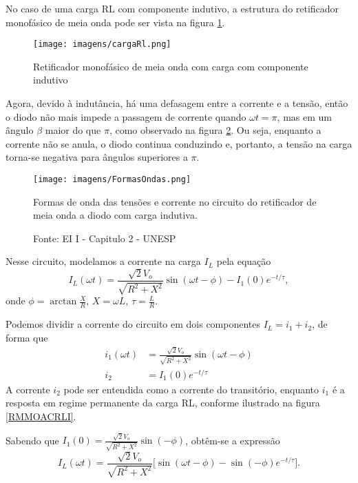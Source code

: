 No caso de uma carga RL com componente indutivo, a estrutura do retificador monofásico de meia onda pode ser vista na figura \ref{fig:RMMOACRL}.

\begin{figure}[h]
\center
\texttt{[image: imagens/cargaRl.png]}
\caption{Retificador monofásico de meia onda com carga com componente indutivo}\label{fig:RMMOACRL}
\end{figure}

Agora, devido à indutância, há uma defasagem entre a corrente e a tensão, então o diodo não mais impede a passagem de corrente quando $\omega t = \pi$, mas em um ângulo $\beta$ maior do que $\pi$, como observado na figura \ref{fig:FO}. Ou seja, enquanto a corrente não se anula, o diodo continua conduzindo e, portanto, a tensão na carga torna-se negativa para ângulos superiores a $\pi$.

\begin{figure}[h]
\center
\texttt{[image: imagens/FormasOndas.png]}
\caption{Formas de onda das tensões e corrente no circuito do retificador de meia onda a diodo com carga indutiva.}\label{fig:FO}
\caption*{Fonte: EI I - Capitulo 2 - UNESP \protect\footnotemark}
\end{figure}


Nesse circuito, modelamos a corrente na carga $I_L$ pela equação \[
I_{L}(\omega{t}) = {\frac{\sqrt{2}V_o}{\sqrt{R^2 + X^2}}\sin{\left(\omega{t}-\phi\right)} - I_{1}\left(0\right)e^{-t/\tau}}
,\] onde $\phi = \arctan{\frac{X}{R}}$, $ {X} = \omega{L} $,  $\tau = \frac{L}{R}$.

Podemos dividir a corrente do circuito em dois componentes $I_L = i_1 + i_2$, de forma que
\begin{align*}
    i_{1}(\omega{t}) &= {\frac{\sqrt{2}V_o}{\sqrt{R^2 + X^2}}\sin{\left(\omega{t}-\phi\right)}}\\
	i_{2} &= I_{1}\left(0\right)e^{-t/\tau}
\end{align*}
A corrente $i_{2}$ pode ser entendida como a corrente do transitório, enquanto $i_{1}$ é a resposta em regime permanente da carga RL, conforme ilustrado na figura \ref{RMMOACRLI}.

Sabendo que $I_{1}(0) = {\frac{\sqrt{2}V_o}{\sqrt{R^2 + X^2}}}\sin{(-\phi)}$, obtêm-se a expressão \[
 I_{L}(\omega{t}) = {\frac{\sqrt{2}V_o}{\sqrt{R^2 + X^2}}[\sin{\left(\omega{t}-\phi\right)} - \sin{(-\phi)}e^{-t/\tau}}]
.\]

